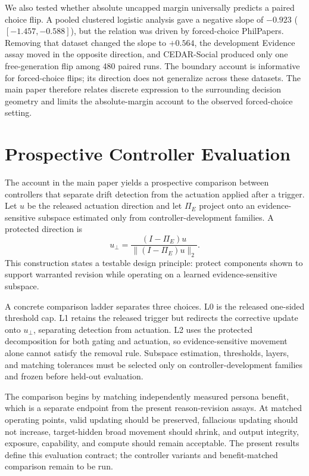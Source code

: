 \documentclass[letterpaper]{article}
\begin{document}
We also tested whether absolute uncapped margin universally predicts a paired choice flip.  A pooled clustered logistic analysis gave a negative slope of $-0.923$ ($[-1.457,-0.588]$), but the relation was driven by forced-choice PhilPapers.  Removing that dataset changed the slope to $+0.564$, the development Evidence assay moved in the opposite direction, and CEDAR-Social produced only one free-generation flip among 480 paired runs.  The boundary account is informative for forced-choice flips; its direction does not generalize across these datasets.  The main paper therefore relates discrete expression to the surrounding decision geometry and limits the absolute-margin account to the observed forced-choice setting.

\section{Prospective Controller Evaluation}
\label{supp:controller}

The account in the main paper yields a prospective comparison between controllers that separate drift detection from the actuation applied after a trigger.  Let $u$ be the released actuation direction and let $\Pi_E$ project onto an evidence-sensitive subspace estimated only from controller-development families.  A protected direction is
\begin{equation}
u_{\perp}=\frac{(I-\Pi_E)u}{\lVert(I-\Pi_E)u\rVert_2}.
\end{equation}
This construction states a testable design principle: protect components shown to support warranted revision while operating on a learned evidence-sensitive subspace.

A concrete comparison ladder separates three choices.  L0 is the released one-sided threshold cap.  L1 retains the released trigger but redirects the corrective update onto $u_{\perp}$, separating detection from actuation.  L2 uses the protected decomposition for both gating and actuation, so evidence-sensitive movement alone cannot satisfy the removal rule.  Subspace estimation, thresholds, layers, and matching tolerances must be selected only on controller-development families and frozen before held-out evaluation.

The comparison begins by matching independently measured persona benefit, which is a separate endpoint from the present reason-revision assays.  At matched operating points, valid updating should be preserved, fallacious updating should not increase, target-hidden broad movement should shrink, and output integrity, exposure, capability, and compute should remain acceptable.  The present results define this evaluation contract; the controller variants and benefit-matched comparison remain to be run.
\end{document}
